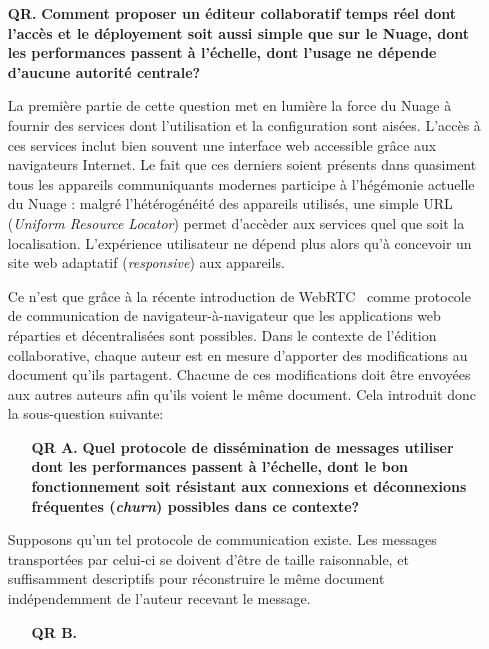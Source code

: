 \begin{itemize}
\item [\textbf{QR.}] \textbf{Comment proposer un éditeur collaboratif temps réel
    dont l'accès et le déployement soit aussi simple que sur le Nuage, dont les
    performances passent à l'échelle, dont l'usage ne dépende d'aucune autorité
    centrale?}
  
  La première partie de cette question met en lumière la force du Nuage à
  fournir des services dont l'utilisation et la configuration sont
  aisées. L'accès à ces services inclut bien souvent une interface web
  accessible grâce aux navigateurs Internet. Le fait que ces derniers soient
  présents dans quasiment tous les appareils communiquants modernes participe à
  l'hégémonie actuelle du Nuage : malgré l'hétérogénéité des appareils utilisés,
  une simple URL (\emph{Uniform Resource Locator}) permet d'accèder aux services
  quel que soit la localisation. L'expérience utilisateur ne dépend plus alors
  qu'à concevoir un site web adaptatif (\emph{responsive}) aux appareils.

  Ce n'est que grâce à la récente introduction de WebRTC~\cite{webrtc} comme
  protocole de communication de navigateur-à-navigateur que les applications web
  réparties et décentralisées sont possibles. Dans le contexte de l'édition
  collaborative, chaque auteur est en mesure d'apporter des modifications au
  document qu'ils partagent. Chacune de ces modifications doit être envoyées aux
  autres auteurs afin qu'ils voient le même document.  Cela
  introduit donc la sous-question suivante:
  \begin{itemize}
  \item [\textbf{QR A.}] \textbf{Quel protocole de dissémination de messages
      utiliser dont les performances passent à l'échelle, dont le bon
      fonctionnement soit résistant aux connexions et déconnexions fréquentes
      (\emph{churn}) possibles dans ce contexte?}    
  \end{itemize}

  Supposons qu'un tel protocole de communication existe. Les messages
  transportées par celui-ci se doivent d'être de taille raisonnable, et
  suffisamment descriptifs pour réconstruire le même document indépendemment de
  l'auteur recevant le message.
  \begin{itemize}
  \item [\textbf{QR B.}] \textbf{}
  \end{itemize}
\end{itemize}

